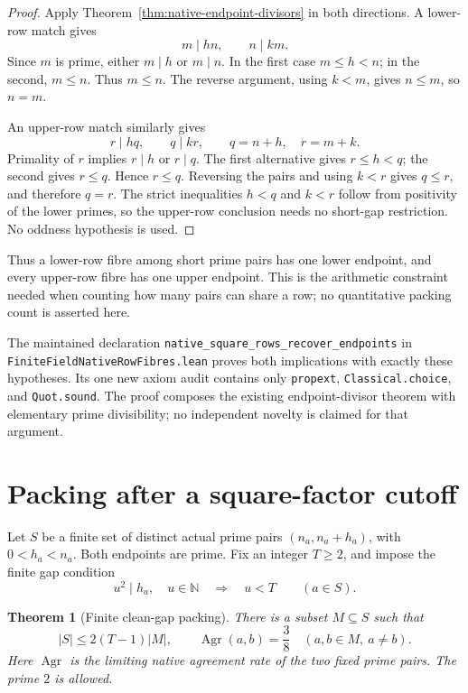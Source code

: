 \documentclass[11pt]{article}
\newtheorem{theorem}{Theorem}[section]
\begin{document}
\begin{proof}
Apply Theorem~\ref{thm:native-endpoint-divisors} in both directions.
A lower-row match gives
\[
 m\mid hn,\qquad n\mid km.
\]
Since \(m\) is prime, either \(m\mid h\) or \(m\mid n\).
In the first case \(m\le h<n\); in the second, \(m\le n\).
Thus \(m\le n\). The reverse argument, using \(k<m\), gives
\(n\le m\), so \(n=m\).

An upper-row match similarly gives
\[
 r\mid hq,\qquad q\mid kr,
 \qquad q=n+h,\quad r=m+k.
\]
Primality of \(r\) implies \(r\mid h\) or \(r\mid q\).
The first alternative gives \(r\le h<q\); the second gives \(r\le q\).
Hence \(r\le q\). Reversing the pairs and using \(k<r\) gives
\(q\le r\), and therefore \(q=r\).
The strict inequalities \(h<q\) and \(k<r\) follow from positivity
of the lower primes, so the upper-row conclusion needs no short-gap
restriction. No oddness hypothesis is used.
\end{proof}

Thus a lower-row fibre among short prime pairs has one lower endpoint,
and every upper-row fibre has one upper endpoint. This is the arithmetic
constraint needed when counting how many pairs can share a row;
no quantitative packing count is asserted here.

The maintained declaration
\texttt{native\_square\_rows\_recover\_endpoints} in
\texttt{FiniteFieldNativeRowFibres.\allowbreak lean}
proves both implications with exactly these hypotheses.
Its one new axiom audit contains only \texttt{propext},
\texttt{Classical.choice}, and \texttt{Quot.sound}.
The proof composes the existing endpoint-divisor theorem with elementary
prime divisibility; no independent novelty is claimed for that argument.

\section{Packing after a square-factor cutoff}
\label{sec:native-clean-packing}

Let \(S\) be a finite set of distinct actual prime pairs
\((n_a,n_a+h_a)\), with \(0<h_a<n_a\).
Both endpoints are prime. Fix an integer \(T\ge2\), and impose the
finite gap condition
\begin{equation}
 u^2\mid h_a,\quad u\in\mathbb N
       \quad\Longrightarrow\quad u<T
       \qquad(a\in S).
 \label{eq:native-clean-gap}
\end{equation}

\begin{theorem}[Finite clean-gap packing]
\label{thm:native-clean-packing}
There is a subset \(M\subseteq S\) such that
\begin{equation}
 |S|\le2(T-1)|M|,
 \qquad
 \operatorname{Agr}(a,b)=\frac38
       \quad(a,b\in M,\ a\ne b).
 \label{eq:native-clean-packing}
\end{equation}
Here \(\operatorname{Agr}\) is the limiting native agreement rate
of the two fixed prime pairs. The prime \(2\) is allowed.
\end{theorem}
\end{document}
